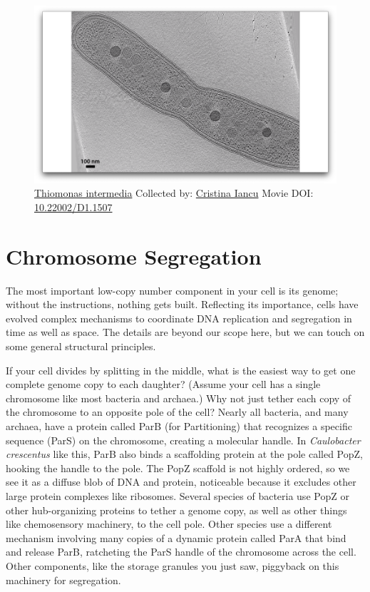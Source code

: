 \documentclass[]{tufte-book}
\begin{document}
\begin{figure}
\includegraphics{movie_stills/5_1} \caption[\protect\hyperlink{tree}{Thiomonas intermedia} Collected by:
\protect\hyperlink{cristina_iancu}{Cristina Iancu} Movie DOI:
\href{https://doi.org/10.22002/D1.1507}{10.22002/D1.1507}]{\protect\hyperlink{tree}{Thiomonas intermedia} Collected by:
\protect\hyperlink{cristina_iancu}{Cristina Iancu} Movie DOI:
\href{https://doi.org/10.22002/D1.1507}{10.22002/D1.1507}}\label{fig:5-1}
\end{figure}

\section{Chromosome Segregation}\label{chromosome-segregation}

The most important low-copy number component in your cell is its genome;
without the instructions, nothing gets built. Reflecting its importance,
cells have evolved complex mechanisms to coordinate DNA replication and
segregation in time as well as space. The details are beyond our scope
here, but we can touch on some general structural principles.

If your cell divides by splitting in the middle, what is the easiest way
to get one complete genome copy to each daughter? (Assume your cell has
a single chromosome like most bacteria and archaea.) Why not just tether
each copy of the chromosome to an opposite pole of the cell? Nearly all
bacteria, and many archaea, have a protein called ParB (for
Partitioning) that recognizes a specific sequence (ParS) on the
chromosome, creating a molecular handle. In \emph{Caulobacter
crescentus} like this, ParB also binds a scaffolding protein at the pole
called PopZ, hooking the handle to the pole. The PopZ scaffold is not
highly ordered, so we see it as a diffuse blob of DNA and protein,
noticeable because it excludes other large protein complexes like
ribosomes. Several species of bacteria use PopZ or other hub-organizing
proteins to tether a genome copy, as well as other things like
chemosensory machinery, to the cell pole. Other species use a different
mechanism involving many copies of a dynamic protein called ParA that
bind and release ParB, ratcheting the ParS handle of the chromosome
across the cell. Other components, like the storage granules you just
saw, piggyback on this machinery for segregation.
\end{document}
